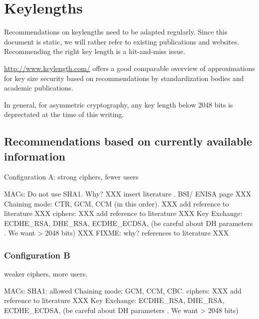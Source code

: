 \section{Keylengths}

Recommendations on keylengths need to be adapted regularly. Since this document is static, we will rather refer to 
existing publications and websites.  Recommending the right key length is a hit-and-miss issue.

\url{http://www.keylength.com/} offers a good comparable overview of approximations for key size security based on recommendations by standardization bodies and academic publications.

In general, for asymmetric cryptography, any key length below 2048 bits is deprectated at the time of this writing.





\subsection{Recommendations based on currently available information}

Configuration A:
strong ciphers, fewer users

MACs: Do not use SHA1. Why? XXX insert literature . BSI/ ENISA page XXX
Chaining mode: CTR, GCM, CCM (in this order).  XXX add reference to literature XXX
ciphers:     XXX add reference to literature XXX
Key Exchange: ECDHE_RSA, DHE_RSA, ECDHE_ECDSA, (be careful about DH parameters . We want > 2048 bits) XXX FIXME: why? references to literature XXX


\subsubsection{Configuration B}
weaker ciphers, more users.


MACs: SHA1:  allowed
Chaining mode: GCM, CCM, CBC.
ciphers:    XXX add reference to literature XXX
Key Exchange: ECDHE_RSA, DHE_RSA, ECDHE_ECDSA, (be careful about DH parameters . We want > 2048 bits)
